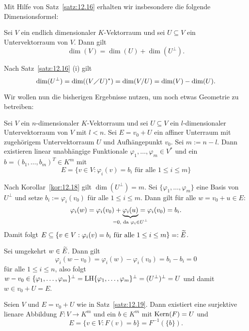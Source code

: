 Mit Hilfe von Satz~\ref{satz:12.16} erhalten wir insbesondere die folgende Dimensionsformel:

\begin{korollar}
	\label{kor:12.18}
	Sei $V$ ein endlich dimensionaler $K$-Vektorraum und sei $U \subseteq V$ ein Untervektorraum von $V$.
	Dann gilt
	\[
		\dim(V) = \dim(U) + \dim(U^\perp).
	\]
\end{korollar}

\begin{beweis}
	Nach Satz~\ref{satz:12.16} (i) gilt
	\[
		\dim(U^\perp) = \dim((V\diagup U)^*) = \dim(V/U) = \dim(V) - \dim(U). 
	\]
\end{beweis}

Wir wollen nun die bisherigen Ergebnisse nutzen, um noch etwas Geometrie zu betreiben:

\begin{satz}
	\label{satz:12.19}
	Sei $V$ ein $n$-dimensionaler $K$-Vektorraum und sei $U \subseteq V$ ein $l$-dimensionaler Untervektorraum von $V$ mit $l < n$.
	Sei $E = v_0 + U$ ein affiner Unterraum mit zugehörigem Untervektorraum $U$ und Aufhängepunkt $v_0$.
	Sei $m := n -l$.
	Dann existieren linear unabhängige Funktionale $\varphi_1, \dots, \varphi_m \in V^*$ und ein $b = (b_1,\dots,b_m)^T \in K^m$ mit
	\[
		E = \{v \in V : \varphi_i(v) = b_i \text{ für alle } 1 \leq i \leq m\}
	\]
\end{satz}
  
\begin{beweis}
	Nach Korollar~\ref{kor:12.18} gilt $\dim(U^\perp) = m$.
	Sei $\{\varphi_1,\dots,\varphi_m\}$ eine Basis von $U^\perp$ und setze $b_i := \varphi_i(v_0)$ für alle $1 \leq i \leq m$.
	Dann gilt für alle $w = v_0 + u \in E$:
	\[
		\varphi_i(w) = \varphi_i(v_0) + \Underbrace{\varphi_i(u)}{\mathclap{=0\text{, da } \varphi_i \in U^\perp}} = \varphi_i(v_0) = b_i.
	\]
	Damit folgt $E \subseteq \{v \in V : \varphi_i(v) = b_i \text{ für alle }1 \leq i \leq m\} =: \widetilde{E}$.
	
	Sei umgekehrt $w \in \widetilde{E}$.
	Dann gilt
	\[
		\varphi_i(w - v_0) = \varphi_i(w) - \varphi_i(v_0) = b_i - b_i = 0
	\]
	für alle $1 \leq i \leq n$, also folgt $w - v_0 \in \{\varphi_1,\dots,\varphi_m\}^\perp = \operatorname{LH}\{\varphi_1,\dots,\varphi_m\}^\perp = (U^\perp)^\perp = U$ und damit $w \in v_0 + U = E$. 
\end{beweis}

\begin{korollar}
	\label{kor:12.20}
	Seien $V$ und $E = v_0 + U$ wie in Satz~\ref{satz:12.19}.
	Dann existiert eine surjektive lienare Abbildung $F \colon V \rightarrow K^m$ und ein $b \in K^m$ mit $\operatorname{Kern}(F) = U$ und
	\[
		E = \{v \in V : F(v) = b\} = F^{-1}(\{b\}).
	\]
\end{korollar}


